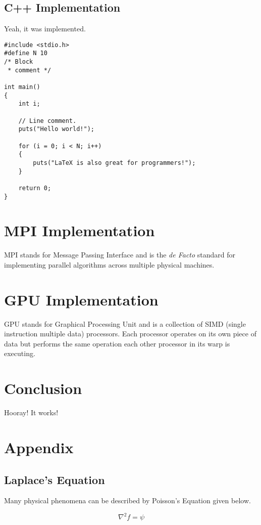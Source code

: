 \documentclass{article}
\numberwithin{equation}{subsection}
\begin{document}
\subsection{C++ Implementation}
Yeah, it was implemented.

\begin{lstlisting}
#include <stdio.h>
#define N 10
/* Block
 * comment */

int main()
{
    int i;

    // Line comment.
    puts("Hello world!");
    
    for (i = 0; i < N; i++)
    {
        puts("LaTeX is also great for programmers!");
    }

    return 0;
}
\end{lstlisting}

\section{MPI Implementation}
MPI stands for Message Passing Interface and is the \textit{de Facto} standard for implementing parallel algorithms across multiple physical machines.

\section{GPU Implementation}
GPU stands for Graphical Processing Unit and is a collection of SIMD (single instruction multiple data) processors. Each processor operates on its own piece of data but performs the same operation each other processor in its warp is executing.

\section{Conclusion}
Hooray! It works!

\section{Appendix}

\subsection{Laplace's Equation} \label{sec_laplace}
Many physical phenomena can be described by Poisson's Equation given below.

\begin{equation} \label{eq_poisson}
\nabla^2 f = \psi
\end{equation}
\end{document}
